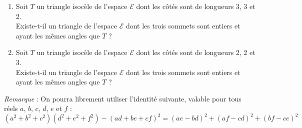 \documentclass[landscape,twocolumn,leqno,a4paper,10pt]{report} %
\begin{document}
\begin{enumerate}
\begin{enumerate}
		\item Soit $T$ un triangle isocèle de l'espace $\mathscr{E}$ dont les côtés sont de longueurs 3, 3 et 2.\\
		Existe-t-il un triangle de l'espace $\mathscr{E}$ dont les trois sommets sont entiers et ayant les mêmes angles que $T$ ?
		\item Soit $T$ un triangle isocèle de l'espace $\mathscr{E}$ dont les côtés sont de longueurs 2, 2 et 3.\\
		Existe-t-il un triangle de l'espace $\mathscr{E}$ dont les trois sommets sont entiers et ayant les mêmes angles que $T$ ?
	\end{enumerate}
	\textit{Remarque} : On pourra librement utiliser l'identité suivante, valable pour tous réels $a$, $b$, $c$, $d$, $e$ et $f$ :
	$$\left(a^{2}+b^{2}+c^{2}\right)\left(d^{2}+e^{2}+f^{2}\right)-(a d+b e+c f)^{2}=(a e-b d)^{2}+(a f-c d)^{2}+(b f-c e)^{2}$$
\end{enumerate}
\end{document}
